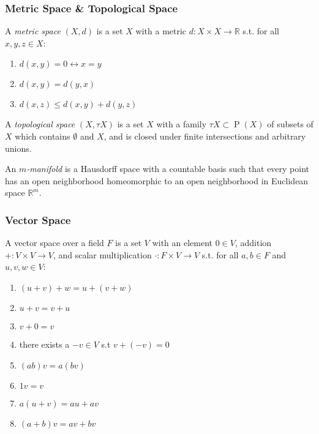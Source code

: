 \documentclass[UTF8,aspectratio=43,11pt,colorlinks,compress,openany]{beamer}%
\begin{document}
\begin{frame}\frametitle{Metric Space \& Topological Space}
\setlength\abovedisplayskip{0pt}
\setlength\belowdisplayskip{0pt}
\begin{definition}
	A \emph{metric space} $(X,d)$ is a set $X$ with a metric $d:X\times X\to \mathbb{R}$ s.t. for all $x,y,z\in X$:
\begin{enumerate}
	\item $d(x,y)=0\leftrightarrow x=y$
	\item $d(x,y)=d(y,x)$
	\item $d(x,z)\leq d(x,y)+d(y,z)$
\end{enumerate}
\end{definition}
\begin{definition}
	A \emph{topological space} $(X,\tau X)$ is a set $X$ with a family $\tau X\subset\operatorname{P}(X)$ of subsets of $X$ which contains $\emptyset$ and $X$, and is closed under finite intersections and arbitrary unions.
\end{definition}
\begin{definition}[Manifold]
	An \emph{$m$-manifold} is a Hausdorff space with a countable basis such that every point has an open neighborhood homeomorphic to an open neighborhood in Euclidean space $\mathbb{R}^m$.
\end{definition}
\end{frame}

\begin{frame}\frametitle{Vector Space}
	\begin{definition}
		A vector space over a field $F$ is a set $V$ with an element $0\in V$, addition $+:V\times V\to V$, and scalar multiplication $\cdot:F\times V\to V$ s.t. for all $a,b\in F$ and $u,v,w\in V$:
		\begin{enumerate}
			\item $(u+v)+w=u+(v+w)$
			\item $u+v=v+u$
			\item $v+0=v$
			\item there exists a $-v\in V$ s.t $v+(-v)=0$
			\item $(ab)v=a(bv)$
			\item $1v=v$
			\item $a(u+v)=au+av$
			\item $(a+b)v=av+bv$
		\end{enumerate}
	\end{definition}
\end{frame}
\end{document}
